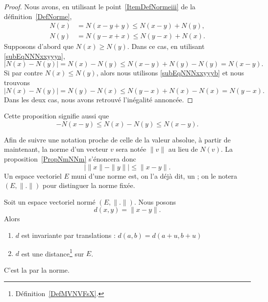 \begin{proof}
	Nous avons, en utilisant le point~\ref{ItemDefNormeiii} de la définition~\ref{DefNorme},
	\begin{subequations}
		\begin{align}
			N(x)&=N(x-y+y)\leq N(x-y)+N(y),	\label{subEqNNNxxyyya}\\
			N(y)&=N(y-x+x)\leq N(y-x)+N(x).	\label{subEqNNNxxyyyb}
		\end{align}
	\end{subequations}
	Supposons d'abord que $N(x)\geq N(y)$. Dans ce cas, en utilisant \eqref{subEqNNNxxyyya},
	\begin{equation}
		\big| N(x)-N(y) \big|=N(x)-N(y)\leq N(x-y)+N(y)-N(y)=N(x-y).
	\end{equation}
	Si par contre $N(x)\leq N(y)$, alors nous utilisons \eqref{subEqNNNxxyyyb} et nous trouvons
	\begin{equation}
		\big| N(x)-N(y) \big|=N(y)-N(x)\leq N(y-x)+N(x)-N(x)=N(y-x).
	\end{equation}
	Dans les deux cas, nous avons retrouvé l'inégalité annoncée.
\end{proof}
Cette proposition signifie aussi que
\begin{equation}	\label{EqNleqNNleqNvqlqbs}
	-N(x-y)\leq N(x)-N(y)\leq N(x-y).
\end{equation}

\begin{normaltext}	
Afin de suivre une notation proche de celle de la valeur absolue, à partir de maintenant, la norme d'un vecteur $v$ sera notée $\| v\|$ au lieu de $N(v)$. La proposition~\ref{PropNmNNm} s'énoncera donc
\begin{equation}
\big| \| x \|-\| y \| \big|\leq \| x-y \|.
\end{equation}
Un espace vectoriel $E$ muni d'une norme est, on l'a déjà dit, un ; on le notera $(E,\| . \|)$ pour distinguer la norme fixée.
\end{normaltext}

\begin{lemmaDef}        \label{LEMooWGBJooYTDYIK}
    Soit un espace vectoriel normé \( (E,\| . \|)\). Nous posons
    \begin{equation}        \label{EQooZYJRooAHnsIG}
        d(x,y)=\| x-y \| .
    \end{equation}
    Alors
    \begin{enumerate}
        \item       \label{ITEMooLITDooPeReOk}
            \( d\) est invariante par translations : $d(a,b)=d(a+u,b+u)$
        \item
            \( d\) est une distance\footnote{Définition~\ref{DefMVNVFsX}.} sur \( E\).
    \end{enumerate}
    C'est la  par la norme.
\end{lemmaDef}

